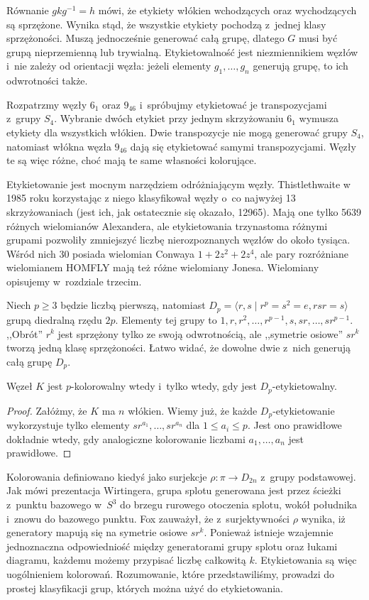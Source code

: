 Równanie $gkg^{-1}=h$ mówi, że etykiety włókien wchodzących oraz wychodzących są sprzężone.
Wynika stąd, że wszystkie etykiety pochodzą z~jednej klasy sprzężoności.
Muszą jednocześnie generować całą grupę, dlatego $G$ musi być grupą nieprzemienną lub trywialną.
Etykietowalność jest niezmiennikiem węzłów i~nie zależy od orientacji węzła:
jeżeli elementy $g_1, \ldots, g_n$ generują grupę, to ich odwrotności także.

Rozpatrzmy węzły $6_1$ oraz $9_{46}$ i~spróbujmy etykietować je transpozycjami z~grupy $S_4$.
Wybranie dwóch etykiet przy jednym skrzyżowaniu $6_1$ wymusza etykiety dla wszystkich włókien.
Dwie transpozycje nie mogą generować grupy $S_4$, natomiast włókna węzła $9_{46}$ dają się etykietować samymi transpozycjami.
Węzły te są więc różne, choć mają te same własności kolorujące.

Etykietowanie jest mocnym narzędziem odróżniającym węzły.
Thistlethwaite w 1985 roku korzystając z niego klasyfikował węzły o~co najwyżej 13 skrzyżowaniach (jest ich, jak ostatecznie się okazało, 12965).
Mają one tylko 5639 różnych wielomianów Alexandera, ale etykietowania trzynastoma różnymi grupami pozwoliły zmniejszyć liczbę nierozpoznanych węzłów do około tysiąca.
Wśród nich 30 posiada wielomian Conwaya $1 + 2z^2 + 2z^4$, ale pary rozróżniane wielomianem HOMFLY mają też różne wielomiany Jonesa.
Wielomiany opisujemy w~rozdziale trzecim.

Niech $p \ge 3$ będzie liczbą pierwszą, natomiast $D_p = \langle r, s \mid r^p = s^2 = e, rsr = s \rangle$ grupą diedralną rzędu $2p$.
Elementy tej grupy to $1, r, r^2, \ldots, r^{p-1}, s, sr, \ldots, sr^{p-1}$.
,,Obrót'' $r^k$ jest sprzężony tylko ze swoją odwrotnością, ale ,,symetrie osiowe'' $sr^k$ tworzą jedną klasę sprzężoności.
Łatwo widać, że dowolne dwie z~nich generują całą grupę $D_p$.

\begin{proposition}
    Węzeł $K$ jest $p$-kolorowalny wtedy i~tylko wtedy, gdy jest $D_p$-etykietowalny.
\end{proposition}

\begin{proof}
    Załóżmy, że $K$ ma $n$ włókien.
    Wiemy już, że każde $D_p$-etykietowanie wykorzystuje tylko elementy $sr^{a_1}, \ldots, sr^{a_n}$ dla $1 \le a_i \le p$.
    Jest ono prawidłowe dokładnie wtedy, gdy analogiczne kolorowanie liczbami $a_1, \ldots, a_n$ jest prawidłowe.
\end{proof}

Kolorowania definiowano kiedyś jako surjekcje $\rho \colon \pi \to D_{2n}$ z~grupy podstawowej.
Jak mówi prezentacja Wirtingera, grupa splotu generowana jest przez ścieżki z~punktu bazowego w~$S^3$ do brzegu rurowego otoczenia splotu, wokół południka i~znowu do bazowego punktu.
Fox zauważył, że z~surjektywności $\rho$ wynika, iż generatory mapują się na symetrie osiowe $sr^k$.
Ponieważ istnieje wzajemnie jednoznaczna odpowiedniość między generatorami grupy splotu oraz łukami diagramu, każdemu możemy przypisać liczbę całkowitą $k$.
Etykietowania są więc uogólnieniem kolorowań.
Rozumowanie, które przedstawiliśmy, prowadzi do prostej klasyfikacji grup, których można użyć do etykietowania.

